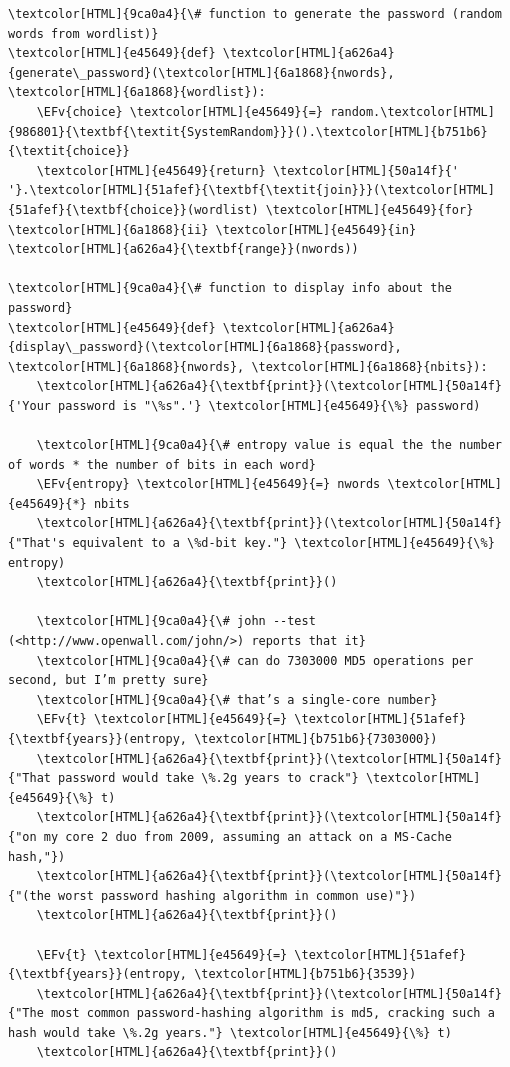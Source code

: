 \documentclass{scrartcl}
\newcommand{\EFv}[1]{\textcolor{EFv}{#1}} %
\begin{document}
\begin{Code}
\begin{Verbatim}[]
\textcolor[HTML]{9ca0a4}{\# function to generate the password (random words from wordlist)}
\textcolor[HTML]{e45649}{def} \textcolor[HTML]{a626a4}{generate\_password}(\textcolor[HTML]{6a1868}{nwords}, \textcolor[HTML]{6a1868}{wordlist}):
    \EFv{choice} \textcolor[HTML]{e45649}{=} random.\textcolor[HTML]{986801}{\textbf{\textit{SystemRandom}}}().\textcolor[HTML]{b751b6}{\textit{choice}}
    \textcolor[HTML]{e45649}{return} \textcolor[HTML]{50a14f}{' '}.\textcolor[HTML]{51afef}{\textbf{\textit{join}}}(\textcolor[HTML]{51afef}{\textbf{choice}}(wordlist) \textcolor[HTML]{e45649}{for} \textcolor[HTML]{6a1868}{ii} \textcolor[HTML]{e45649}{in} \textcolor[HTML]{a626a4}{\textbf{range}}(nwords))

\textcolor[HTML]{9ca0a4}{\# function to display info about the password}
\textcolor[HTML]{e45649}{def} \textcolor[HTML]{a626a4}{display\_password}(\textcolor[HTML]{6a1868}{password}, \textcolor[HTML]{6a1868}{nwords}, \textcolor[HTML]{6a1868}{nbits}):
    \textcolor[HTML]{a626a4}{\textbf{print}}(\textcolor[HTML]{50a14f}{'Your password is "\%s".'} \textcolor[HTML]{e45649}{\%} password)

    \textcolor[HTML]{9ca0a4}{\# entropy value is equal the the number of words * the number of bits in each word}
    \EFv{entropy} \textcolor[HTML]{e45649}{=} nwords \textcolor[HTML]{e45649}{*} nbits
    \textcolor[HTML]{a626a4}{\textbf{print}}(\textcolor[HTML]{50a14f}{"That's equivalent to a \%d-bit key."} \textcolor[HTML]{e45649}{\%} entropy)
    \textcolor[HTML]{a626a4}{\textbf{print}}()

    \textcolor[HTML]{9ca0a4}{\# john --test (<http://www.openwall.com/john/>) reports that it}
    \textcolor[HTML]{9ca0a4}{\# can do 7303000 MD5 operations per second, but I’m pretty sure}
    \textcolor[HTML]{9ca0a4}{\# that’s a single-core number}
    \EFv{t} \textcolor[HTML]{e45649}{=} \textcolor[HTML]{51afef}{\textbf{years}}(entropy, \textcolor[HTML]{b751b6}{7303000})
    \textcolor[HTML]{a626a4}{\textbf{print}}(\textcolor[HTML]{50a14f}{"That password would take \%.2g years to crack"} \textcolor[HTML]{e45649}{\%} t)
    \textcolor[HTML]{a626a4}{\textbf{print}}(\textcolor[HTML]{50a14f}{"on my core 2 duo from 2009, assuming an attack on a MS-Cache hash,"})
    \textcolor[HTML]{a626a4}{\textbf{print}}(\textcolor[HTML]{50a14f}{"(the worst password hashing algorithm in common use)"})
    \textcolor[HTML]{a626a4}{\textbf{print}}()

    \EFv{t} \textcolor[HTML]{e45649}{=} \textcolor[HTML]{51afef}{\textbf{years}}(entropy, \textcolor[HTML]{b751b6}{3539})
    \textcolor[HTML]{a626a4}{\textbf{print}}(\textcolor[HTML]{50a14f}{"The most common password-hashing algorithm is md5, cracking such a hash would take \%.2g years."} \textcolor[HTML]{e45649}{\%} t)
    \textcolor[HTML]{a626a4}{\textbf{print}}()


\end{Verbatim}
\end{Code}
\end{document}
